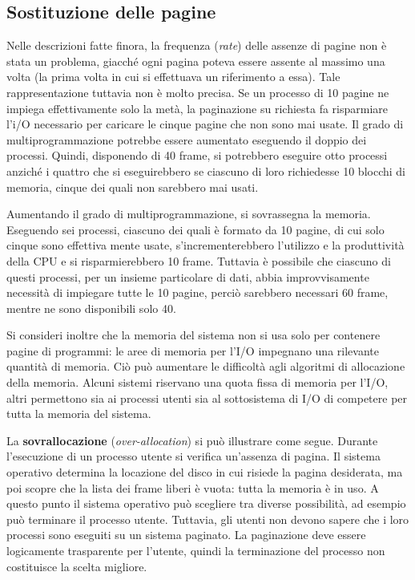 \documentclass[11pt,a4paper]{article}
\begin{document}
\subsection{Sostituzione delle pagine}
Nelle descrizioni fatte finora, la frequenza (\emph{rate}) delle assenze di pagine non è stata un pro­blema, giacché ogni pagina poteva essere assente al massimo una volta (la prima volta in cui si effettuava un riferimento a essa). Tale rappresentazione tuttavia non
è molto precisa. Se un processo di 10 pagine ne impiega effettivamente solo la metà, la pa­ginazione su richiesta fa risparmiare l'i/O necessario per caricare le cinque pagine che non
sono mai usate. Il grado di multiprogrammazione potrebbe essere aumentato eseguendo il
doppio dei processi. Quindi, disponendo di 40 frame, si potrebbero eseguire otto processi
anziché i quattro che si eseguirebbero se ciascuno di loro richiedesse 10 blocchi di memoria,
cinque dei quali non sarebbero mai usati.

Aumentando il grado di multiprogrammazione, si sovrassegna la memoria. Eseguen­do sei processi, ciascuno dei quali è formato da 10 pagine, di cui solo cinque sono effettiva­
mente usate, s'incrementerebbero l'utilizzo e la produttività della CPU e si risparmierebbero
10 frame. Tuttavia è possibile che ciascuno di questi processi, per un insieme particolare di
dati, abbia improvvisamente necessità di impiegare tutte le 10 pagine, perciò sarebbero ne­cessari 60 frame, mentre ne sono disponibili solo 40.


Si consideri inoltre che la memoria del sistema non si usa solo per contenere pagine di
programmi: le aree di memoria per l'I/O impegnano una rilevante quantità di memoria. Ciò
può aumentare le difficoltà agli algoritmi di allocazione della memoria. Al­cuni sistemi riservano una quota fissa di memoria per l'I/O, altri permettono sia ai processi
utenti sia al sottosistema di I/O di competere per tutta la memoria del sistema.

La \textbf{sovrallocazione} (\emph{over-allocation}) si può illustrare come segue. Durante l'esecuzione
di un processo utente si verifica un'assenza di pagina. Il sistema operativo determina la loca­zione del disco in cui risiede la pagina desiderata, ma poi scopre che la lista dei frame liberi
è vuota: tutta la memoria è in uso.
A questo punto il sistema operativo può scegliere tra diverse possibilità, ad esempio
può terminare il processo utente. Tuttavia, gli utenti non devono sapere che i loro processi sono eseguiti su un sistema paginato. La pagi­nazione deve essere logicamente trasparente per l'utente, quindi la terminazione del proces­so non costituisce la scelta migliore.
\end{document}
